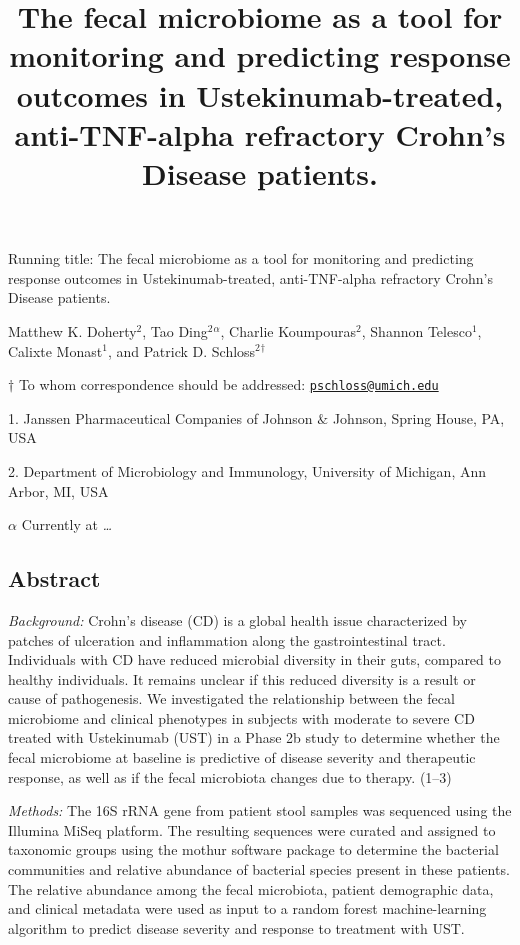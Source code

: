 \documentclass[11pt,]{article}
\title{The fecal microbiome as a tool for monitoring and predicting response
outcomes in Ustekinumab-treated, anti-TNF-alpha refractory Crohn's
Disease patients.}
\author{}
\date{}
\begin{document}
\maketitle

\vspace{35mm}

Running title: The fecal microbiome as a tool for monitoring and
predicting response outcomes in Ustekinumab-treated, anti-TNF-alpha
refractory Crohn's Disease patients.

\vspace{35mm} Matthew K. Doherty\({^2}\), Tao Ding\({^2}\)\({^\alpha}\),
Charlie Koumpouras\({^2}\), Shannon Telesco\({^1}\), Calixte
Monast\({^1}\), and Patrick D. Schloss\({^2}\)\({^\dagger}\)

\(\dagger\) To whom correspondence should be addressed:
\href{mailto:pschloss@umich.edu}{\nolinkurl{pschloss@umich.edu}}

1. Janssen Pharmaceutical Companies of Johnson \({\&}\) Johnson, Spring
House, PA, USA

2. Department of Microbiology and Immunology, University of Michigan,
Ann Arbor, MI, USA

\({\alpha}\) Currently at \emph{\ldots{}}

\newpage

\subsection{Abstract}\label{abstract}

\emph{Background:} Crohn's disease (CD) is a global health issue
characterized by patches of ulceration and inflammation along the
gastrointestinal tract. Individuals with CD have reduced microbial
diversity in their guts, compared to healthy individuals. It remains
unclear if this reduced diversity is a result or cause of pathogenesis.
We investigated the relationship between the fecal microbiome and
clinical phenotypes in subjects with moderate to severe CD treated with
Ustekinumab (UST) in a Phase 2b study to determine whether the fecal
microbiome at baseline is predictive of disease severity and therapeutic
response, as well as if the fecal microbiota changes due to therapy.
(1--3)

\emph{Methods:} The 16S rRNA gene from patient stool samples was
sequenced using the Illumina MiSeq platform. The resulting sequences
were curated and assigned to taxonomic groups using the mothur software
package to determine the bacterial communities and relative abundance of
bacterial species present in these patients. The relative abundance
among the fecal microbiota, patient demographic data, and clinical
metadata were used as input to a random forest machine-learning
algorithm to predict disease severity and response to treatment with
UST.
\end{document}
